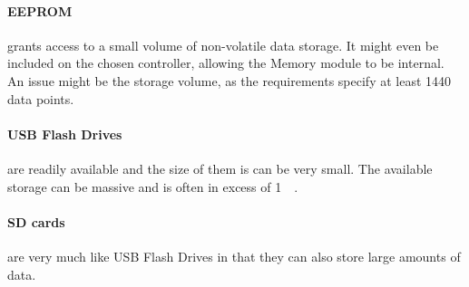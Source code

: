 \paragraph{EEPROM} grants access to a small volume of non-volatile data storage.
It might even be included on the chosen controller, allowing the Memory module to be internal.
An issue might be the storage volume, as the requirements specify at least \num{1440} data points.
\paragraph{USB Flash Drives} are readily available and the size of them is can be very small.
The available storage can be massive and is often in excess of \SI{1}{\giga\byte}.
\paragraph{SD cards} are very much like USB Flash Drives in that they can also store large amounts of data.

\FloatBarrier
